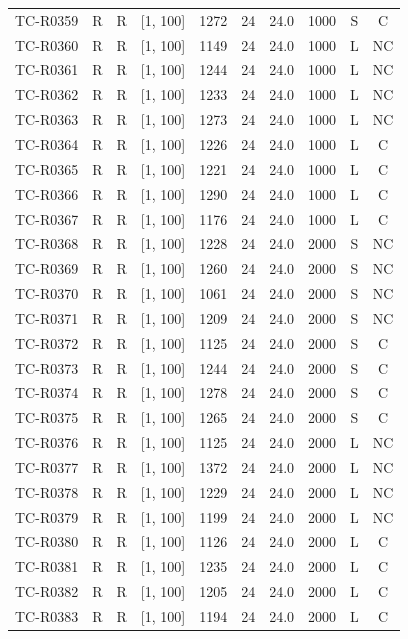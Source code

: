 \begin{longtable}{lccccccccc}
TC-R0359 & R & R & [1, 100] & 1272 & 24 & 24.0 & 1000 & S & C \\
TC-R0360 & R & R & [1, 100] & 1149 & 24 & 24.0 & 1000 & L & NC \\
TC-R0361 & R & R & [1, 100] & 1244 & 24 & 24.0 & 1000 & L & NC \\
TC-R0362 & R & R & [1, 100] & 1233 & 24 & 24.0 & 1000 & L & NC \\
TC-R0363 & R & R & [1, 100] & 1273 & 24 & 24.0 & 1000 & L & NC \\
TC-R0364 & R & R & [1, 100] & 1226 & 24 & 24.0 & 1000 & L & C \\
TC-R0365 & R & R & [1, 100] & 1221 & 24 & 24.0 & 1000 & L & C \\
TC-R0366 & R & R & [1, 100] & 1290 & 24 & 24.0 & 1000 & L & C \\
TC-R0367 & R & R & [1, 100] & 1176 & 24 & 24.0 & 1000 & L & C \\
TC-R0368 & R & R & [1, 100] & 1228 & 24 & 24.0 & 2000 & S & NC \\
TC-R0369 & R & R & [1, 100] & 1260 & 24 & 24.0 & 2000 & S & NC \\
TC-R0370 & R & R & [1, 100] & 1061 & 24 & 24.0 & 2000 & S & NC \\
TC-R0371 & R & R & [1, 100] & 1209 & 24 & 24.0 & 2000 & S & NC \\
TC-R0372 & R & R & [1, 100] & 1125 & 24 & 24.0 & 2000 & S & C \\
TC-R0373 & R & R & [1, 100] & 1244 & 24 & 24.0 & 2000 & S & C \\
TC-R0374 & R & R & [1, 100] & 1278 & 24 & 24.0 & 2000 & S & C \\
TC-R0375 & R & R & [1, 100] & 1265 & 24 & 24.0 & 2000 & S & C \\
TC-R0376 & R & R & [1, 100] & 1125 & 24 & 24.0 & 2000 & L & NC \\
TC-R0377 & R & R & [1, 100] & 1372 & 24 & 24.0 & 2000 & L & NC \\
TC-R0378 & R & R & [1, 100] & 1229 & 24 & 24.0 & 2000 & L & NC \\
TC-R0379 & R & R & [1, 100] & 1199 & 24 & 24.0 & 2000 & L & NC \\
TC-R0380 & R & R & [1, 100] & 1126 & 24 & 24.0 & 2000 & L & C \\
TC-R0381 & R & R & [1, 100] & 1235 & 24 & 24.0 & 2000 & L & C \\
TC-R0382 & R & R & [1, 100] & 1205 & 24 & 24.0 & 2000 & L & C \\
TC-R0383 & R & R & [1, 100] & 1194 & 24 & 24.0 & 2000 & L & C \\

\end{longtable}

